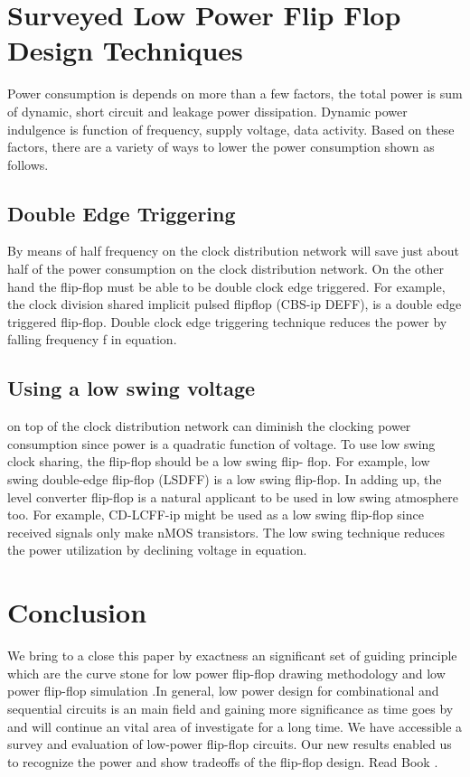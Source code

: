 \documentclass{article}
\begin{document}
\section{Surveyed Low Power Flip Flop Design
	Techniques}
	Power consumption is depends on more than a few factors,
	the total power is sum of dynamic, short circuit and leakage
	power dissipation. Dynamic power indulgence is function of
	frequency, supply voltage, data activity. Based on these
	factors, there are a variety of ways to lower the power
	consumption shown as follows.
	
\subsection{Double Edge Triggering}
    By means of half frequency on
	the clock distribution network will save just about half of the
	power consumption on the clock distribution network. On
	the other hand the flip-flop must be able to be double clock
	edge triggered.
	For example, the clock division shared implicit pulsed flipflop
	(CBS-ip DEFF), is a double edge triggered flip-flop.
	Double clock edge triggering technique reduces the power
	by falling frequency f in equation.

\subsection{Using a low swing voltage} on top of the clock
	distribution network can diminish the clocking power
	consumption since power is a quadratic function of voltage.
	To use low swing clock sharing, the flip-flop should be a
	low swing flip- flop.
	For example, low swing double-edge flip-flop (LSDFF)
	is a low swing flip-flop. In adding up, the level converter
	flip-flop is a natural applicant to be used in low swing
	atmosphere too. For example, CD-LCFF-ip might be
	used as a low swing flip-flop since received signals only
	make nMOS transistors. The low swing technique
	reduces the power utilization by declining voltage in
	equation. 
\section{Conclusion}
We bring to a close this paper by exactness an significant set
of guiding principle which are the curve stone for low power
flip-flop drawing methodology and low power flip-flop
simulation .In general, low power design for combinational
and sequential circuits is an main field and gaining more
significance as time goes by and will continue an vital area
of investigate for a long time. We have accessible a survey
and evaluation of low-power flip-flop circuits. Our new
results enabled us to recognize the power and show tradeoffs
of the flip-flop design. Read Book \cite{StatAmit2018}\cite{NoUma2013}.



\end{document}
